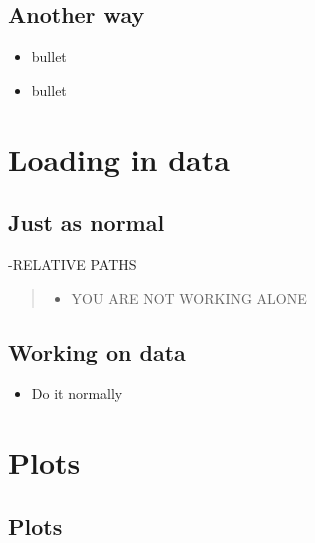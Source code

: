 \documentclass[]{article}
\providecommand{\tightlist}{%
  \setlength{\itemsep}{0pt}\setlength{\parskip}{0pt}}
\begin{document}
\hypertarget{another-way}{%
\subsection{Another way}\label{another-way}}

\begin{itemize}
\item
  bullet
\item
  bullet
\end{itemize}

\hypertarget{loading-in-data}{%
\section{Loading in data}\label{loading-in-data}}

\hypertarget{just-as-normal}{%
\subsection{Just as normal}\label{just-as-normal}}

-RELATIVE PATHS

\begin{quote}
\begin{itemize}
\tightlist
\item
  YOU ARE NOT WORKING ALONE
\end{itemize}
\end{quote}

\hypertarget{working-on-data}{%
\subsection{Working on data}\label{working-on-data}}

\begin{itemize}
\tightlist
\item
  Do it normally
\end{itemize}

\hypertarget{plots}{%
\section{Plots}\label{plots}}

\hypertarget{plots-1}{%
\subsection{Plots}\label{plots-1}}
\end{document}

